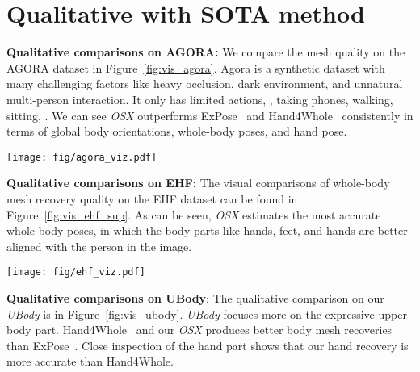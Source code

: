 \documentclass[10pt,twocolumn,letterpaper]{article}
\newcommand{\modelname}{\emph{OSX}\xspace}
\newcommand{\dataname}{\emph{UBody}\xspace}
\begin{document}
\section{Qualitative with SOTA method}
\label{sec:visual}

\noindent\textbf{Qualitative comparisons on AGORA:} 
We compare the mesh quality on the AGORA dataset in Figure~\ref{fig:vis_agora}. Agora is a synthetic dataset with many challenging factors like heavy occlusion, dark environment, and unnatural multi-person interaction. It only has limited actions, \eg, taking phones, walking, sitting,  \etc. We can see \modelname outperforms ExPose~\cite{PavlakosGeorgios2020expose} and Hand4Whole~\cite{GyeongsikMoon2020hand4whole} consistently in terms of global body orientations, whole-body poses, and hand pose.    


\begin{figure*}[h]
\begin{center}
\texttt{[image: fig/agora\_viz.pdf]}
\end{center}
\vspace{-0.6cm}
\caption{
Comparisons of existing 3D whole-body estimation methods on AGORA.
}
\label{fig:vis_agora}
\end{figure*}


\noindent\textbf{Qualitative comparisons on EHF:} 
The visual comparisons of whole-body mesh recovery quality on the EHF dataset can be found in Figure~\ref{fig:vis_ehf_sup}. As can be seen, \modelname estimates the most accurate whole-body poses, in which the body parts like hands, feet, and hands are better aligned with the person in the image. 

\begin{figure*}[h]
\begin{center}
\texttt{[image: fig/ehf\_viz.pdf]}
\end{center}
\vspace{-0.6cm}
\caption{
Comparisons of existing 3D whole-body estimation methods on EHF.
}
\label{fig:vis_ehf_sup}
\end{figure*}

\noindent\textbf{Qualitative comparisons on UBody}: 
The qualitative comparison on our \dataname is in Figure~\ref{fig:vis_ubody}. \dataname focuses more on the expressive upper body part. Hand4Whole~\cite{GyeongsikMoon2020hand4whole} and our \modelname produces better body mesh recoveries than ExPose~\cite{YufeiXu2022ViTPoseSV}. Close inspection of the hand part shows that our hand recovery is more accurate than Hand4Whole. 
\end{document}
